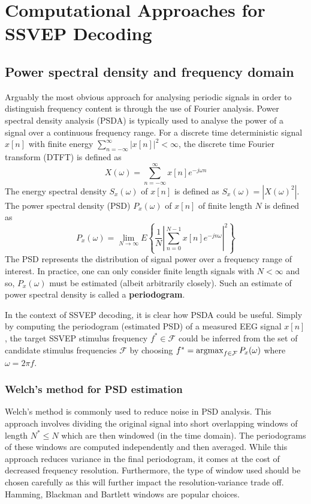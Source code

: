 \section{Computational Approaches for SSVEP Decoding}
\subsection{Power spectral density and frequency domain}
Arguably the most obvious approach for analysing periodic signals in order to distinguish frequency content is through the use of Fourier analysis. Power spectral density analysis (PSDA) is typically used to analyse the power of a signal over a continuous frequency range. For a discrete time deterministic signal ${x[n]}$ with finite energy $\sum_{n=-\infty}^\infty |x[n]|^2 < \infty$, the discrete time Fourier transform (DTFT) is defined as 
\begin{equation}
    X(\omega)=\sum_{n=-\infty}^{\infty} x[n] e^{-j \omega n}
\end{equation}
The energy spectral density $S_x(\omega)$ of $x[n]$ is defined as $S_x(\omega) = |X(\omega)^2|$. The power spectral density (PSD) $P_x(\omega)$ of $x[n]$ of finite length $N$ is defined as 
\begin{equation}
P_x(\omega)=\lim _{N \rightarrow \infty} E\left\{\frac{1}{N}\left|\sum_{n=0}^{N-1} x[n] e^{-jn \omega}\right|^{2}\right\}
\end{equation}
The PSD represents the distribution of signal power over a frequency range of interest. In practice, one can only consider finite length signals with $N < \infty$ and so, $P_x(\omega)$ must be estimated (albeit arbitrarily closely). Such an estimate of power spectral density is called a \textbf{periodogram}.

In the context of SSVEP decoding, it is clear how PSDA could be useful. Simply by computing the periodogram (estimated PSD) of a measured EEG signal $x[n]$, the target SSVEP stimulus frequency $f^* \in \mathcal{F}$ could be inferred from the set of candidate stimulus frequencies $\mathcal{F}$ by choosing $f^* = \operatorname*{argmax}_{f \in \mathcal{F}} P_x(\omega)$ where $\omega=2\pi f$. 

\subsubsection{Welch's method for PSD estimation}
Welch's method is commonly used to reduce noise in PSD analysis. This approach involves dividing the original signal into short overlapping windows of length $N^* \leq N$ which are then windowed (in the time domain). The periodograms of these windows are computed independently and then averaged. While this approach reduces variance in the final periodogram, it comes at the cost of decreased frequency resolution. Furthermore, the type of window used should be chosen carefully as this will further impact the resolution-variance trade off. Hamming, Blackman and Bartlett windows are popular choices.

